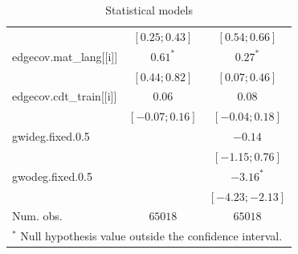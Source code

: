 \begin{table}
\begin{center}
\begin{tabular}{l c c}
                            & $ [  0.25;   0.43]$ & $ [  0.54;   0.66]$ \\
edgecov.mat\_lang[[i]]      & $0.61^{*}$          & $0.27^{*}$          \\
                            & $ [  0.44;   0.82]$ & $ [  0.07;   0.46]$ \\
edgecov.cdt\_train[[i]]     & $0.06$              & $0.08$              \\
                            & $ [ -0.07;   0.16]$ & $ [ -0.04;   0.18]$ \\
gwideg.fixed.0.5            &                     & $-0.14$             \\
                            &                     & $ [ -1.15;   0.76]$ \\
gwodeg.fixed.0.5            &                     & $-3.16^{*}$         \\
                            &                     & $ [ -4.23;  -2.13]$ \\
\hline
Num. obs.                   & $65018$             & $65018$             \\
\hline
\multicolumn{3}{l}{\scriptsize{$^*$ Null hypothesis value outside the confidence interval.}}
\end{tabular}
\caption{Statistical models}
\label{table:coefficients}
\end{center}
\end{table}
